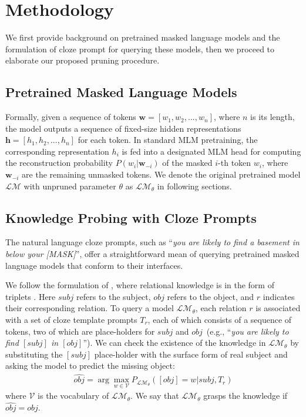 \section{Methodology}
We first provide background on pretrained masked language models and the formulation of cloze prompt for querying these models, then we proceed to 
elaborate our proposed pruning procedure.
\subsection{Pretrained Masked Language Models}
\label{sec:PLMs}
Formally, given a sequence of tokens $\bm{w}=[w_1, w_2, ..., w_n]$, where $n$ is its length, the model outputs a sequence of fixed-size hidden representations $\bm{h}=[h_1, h_2, ..., h_n]$ for each token. In standard MLM pretraining, the corresponding representation $h_{i}$ is fed into a designated MLM head for computing the reconstruction probability $P(w_{i}|\bm{w}_{-i})$ of the masked $i$-th token $w_{i}$, where 
$\bm{w}_{-i}$ are the remaining unmasked tokens. We denote the original pretrained model $\mathcal{LM}$ with unpruned parameter $\theta$ as $\mathcal{LM}_{\theta}$ in following sections.
\subsection{Knowledge Probing with Cloze Prompts}
The natural language cloze prompts, such as ``\textit{you are likely to find a basement in below your [MASK]}'', offer a straightforward mean
of querying pretrained masked language models that conform to their interfaces.

We follow the formulation of \citet{Petroni2020}, where relational knowledge is in the form of triplets . 
Here $subj$ refers to the subject, $obj$ refers to the object, 
and $r$ indicates their corresponding relation. To query a model 
$\mathcal{LM}_{\theta}$, each relation $r$ is associated with a set of 
cloze template prompts $T_r$, each of which consists of a sequence of 
tokens, two of which are place-holders for $subj$ and $obj$~(e.g., ``\textit{you are likely to find $[subj]$ in $[obj]$}''). We can
check the existence of the knowledge in $\mathcal{LM}_\theta$ by 
substituting the $[subj]$ place-holder with the surface form of 
real subject and asking the model to predict the missing object:
\begin{align}\nonumber
\hat{obj}=\arg \max_{w\in \mathcal{V}}P_{\mathcal{LM}_\theta}([obj]=w|subj, T_r)
\end{align}
where $\mathcal{V}$ is the vocabulary of $\mathcal{LM}_\theta$. We say that $\mathcal{LM}_\theta$ grasps the knowledge if $\hat{obj}=obj$.

